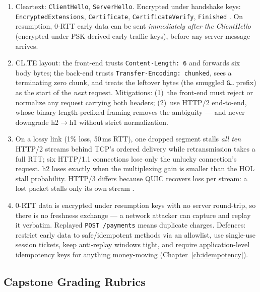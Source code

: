 \begin{enumerate}[label=\textbf{E1.\arabic*}, leftmargin=3.2em]
    PING, RST\_STREAM, PRIORITY, WINDOW\_UPDATE, and GOAWAY still flow ---
    legal and deliberate, so the connection stays diagnosable and
    recoverable. A server that never sends \texttt{WINDOW\_UPDATE} leaves
    the client with a permanently zero window: requests are accepted,
    responses never start, and users see hangs ending in client timeouts.
  \item Cleartext: \texttt{ClientHello}, \texttt{ServerHello}. Encrypted
    under handshake keys: \texttt{EncryptedExtensions},
    \texttt{Certificate}, \texttt{CertificateVerify}, \texttt{Finished}
    \cite{rfc8446}. On resumption, 0-RTT early data can be sent
    \emph{immediately after the ClientHello} (encrypted under PSK-derived
    early traffic keys), before any server message arrives.
  \item CL.TE layout: the front-end trusts \texttt{Content-Length: 6} and
    forwards six body bytes; the back-end trusts
    \texttt{Transfer-Encoding: chunked}, sees a terminating zero chunk, and
    treats the leftover bytes (the smuggled \texttt{G\ldots} prefix) as the
    start of the \emph{next} request. Mitigations: (1)~the front-end must
    reject or normalize any request carrying both headers; (2)~use HTTP/2
    end-to-end, whose binary length-prefixed framing removes the ambiguity
    --- and never downgrade h2$\to$h1 without strict normalization.
  \item On a lossy link (1\% loss, 50\,ms RTT), one dropped segment stalls
    \emph{all ten} HTTP/2 streams behind TCP's ordered delivery while
    retransmission takes a full RTT; six HTTP/1.1 connections lose only the
    unlucky connection's request. h2 loses exactly when the multiplexing
    gain is smaller than the HOL stall probability. HTTP/3 differs because
    QUIC recovers loss per stream: a lost packet stalls only its own stream
    \cite{rfc9000, rfc9114}.
  \item 0-RTT data is encrypted under resumption keys with no server
    round-trip, so there is no freshness exchange --- a network attacker can
    capture and replay it verbatim. Replayed \texttt{POST /payments} means
    duplicate charges. Defences: restrict early data to safe/idempotent
    methods via an allowlist, use single-use session tickets, keep
    anti-replay windows tight, and require application-level idempotency
    keys for anything money-moving (Chapter~\ref{ch:idempotency}).
\end{enumerate}

\subsection{Capstone Grading Rubrics}

